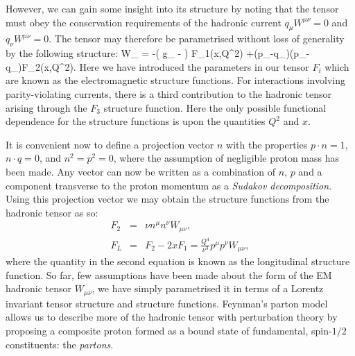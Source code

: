 However, we can gain some insight into its structure by noting that the tensor must obey the conservation requirements of the hadronic current $q_\mu W^{\mu\nu}=0$ and $q_\nu W^{\mu\nu}=0$. The tensor may therefore be parametrised without loss of generality by the following structure:
\be W_{\mu\nu} = -\left( g_{\mu\nu} - \right) F_1(x,Q^2) +\left(p_\mu -q_\mu {}\right)\left(p_\nu -q_\nu {}\right)F_2(x,Q^2).\label{eq:htensor}\ee
Here we have introduced the parameters in our tensor $F_i$ which are known as the electromagnetic structure functions. For interactions involving parity-violating currents, there is a third contribution to the hadronic tensor arising through the $F_3$ structure function. Here the only possible functional dependence for the structure functions is upon the quantities $Q^2$ and $x$.

It is convenient now to define a projection vector $n$ with the properties $ p \cdot n = 1$, $ n \cdot q = 0$, and $n^2 = p^2 = 0$, where the assumption of negligible proton mass has been made. Any vector can now be written as a combination of $n$, $p$ and a component transverse to the proton momentum as a \emph{Sudakov decomposition}. Using this projection vector we may obtain the structure functions from the hadronic tensor as so:
\begin{eqnarray}
 F_2 &=& \nu n^\mu n^\nu W_{\mu\nu},  \label{eq:proj1} \\
 F_L &=& F_2 - 2xF_1 = \frac{Q^4}{\nu^3}  p^\mu p^\nu W_{\mu\nu}, \label{eq:proj2}
\end{eqnarray}
where the quantity in the second equation is known as the longitudinal structure function. So far, few assumptions have been made about the form of the EM hadronic tensor $W_{\mu\nu}$, we have simply parametrised it in terms of a Lorentz invariant tensor structure and structure functions. Feynman's parton model allows us to describe more of the hadronic tensor with perturbation theory by proposing a composite proton formed as a bound state of fundamental, spin-$1/2$ constituents: the \emph{partons}. 

